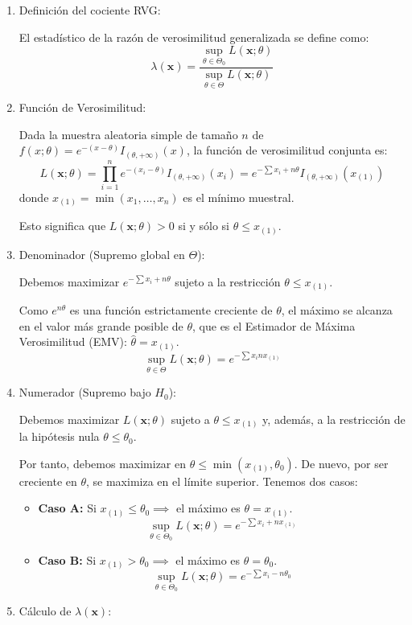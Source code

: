 \begin{enumerate}[label=\color{red}\textbf{\arabic*)}]
	      \begin{enumerate}[label=\arabic*)]
		      \item Definición del cociente RVG:

		            El estadístico de la razón de verosimilitud generalizada se define como: \[
			            \lambda(\mathbf{x})=\dfrac{\sup_{\theta\in \Theta_0}L(\mathbf{x};\theta)}{\sup_{\theta \in \Theta}L(\mathbf{x};\theta)}
		            \]
		      \item Función de Verosimilitud:

		            Dada la muestra aleatoria simple de tamaño $n$ de $f(x;\theta)=e^{-(x-\theta)}I_{(\theta,+\infty)}(x)$, la función de verosimilitud conjunta es: \[
			            L(\mathbf{x};\theta)=\prod_{i=1}^{n} e^{-(x_i-\theta)}I_{(\theta,+\infty)}(x_i)=e^{-\sum x_i+n\theta}I_{(\theta,+\infty)}(x_{(1)})
		            \]
		            donde $x_{(1)}=\min(x_1,\dots,x_n)$ es el mínimo muestral.

		            Esto significa que $L(\mathbf{x};\theta)>0$ si y sólo si $\theta\le x_{(1)}$.
		      \item Denominador (Supremo global en $\Theta$):

		            Debemos maximizar $e^{-\sum x_i+n\theta}$ sujeto a la restricción $\theta\le x_{(1)}$.

		            Como $e^{n\theta}$ es una función estrictamente creciente de $\theta$, el máximo se alcanza en el valor más grande posible de $\theta$, que es el Estimador de Máxima Verosimilitud (EMV): $\hat{\theta}=x_{(1)}$. \[
			            \sup_{\theta\in \Theta}L(\mathbf{x};\theta)=e^{-\sum x_{i}nx_{(1)}}
		            \]
		      \item Numerador (Supremo bajo $H_0$):

		            Debemos maximizar $L(\mathbf{x};\theta)$ sujeto a $\theta\le x_{(1)}$ y, además, a la restricción de la hipótesis nula $\theta\le \theta_0$.

		            Por tanto, debemos maximizar en $\theta\le \min(x_{(1)},\theta_0)$. De nuevo, por ser creciente en $\theta$, se maximiza en el límite superior. Tenemos dos casos:
		            \begin{itemize}[label=\textbullet]
			            \item \textbf{Caso A:} Si $x_{(1)}\le \theta_0\implies$ el máximo es $\theta=x_{(1)}$. \[
				                  \sup_{\theta\in \Theta_0}L(\mathbf{x};\theta)=e^{-\sum x_{i}+nx_{(1)}}
			                  \]
			            \item \textbf{Caso B:} Si $x_{(1)}>\theta_0\implies$ el máximo es $\theta=\theta_0$. \[
				                  \sup_{\theta\in \Theta_0}L(\mathbf{x};\theta)=e^{-\sum x_{i}-n\theta_0}
			                  \]
		            \end{itemize}
		      \item Cálculo de $\lambda(\mathbf{x})$:


\end{enumerate}
\end{enumerate}
